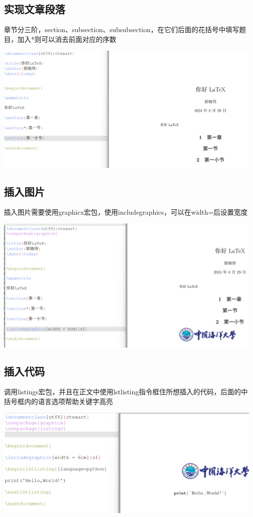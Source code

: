 \documentclass[UTF8,a4paper]{ctexart}
\begin{document}
\begin{sloppypar}
	\subsection{实现文章段落}
	章节分三阶，section、subsection、subsubsection，在它们后面的花括号中填写题目，加入*则可以消去前面对应的序数
	
	\includegraphics[width = 16cm]{15}
	
	\subsection{插入图片}
	插入图片需要使用graphicx宏包，使用includegraphics，可以在width=后设置宽度
	
	\includegraphics[width = 16cm]{16}
	
	\subsection{插入代码}
	调用listings宏包，并且在正文中使用lstlisting指令框住所想插入的代码，后面的中括号框内的语言选项帮助关键字高亮
	
	\includegraphics[width = 16cm]{17}
	

\end{sloppypar}
\end{document}

